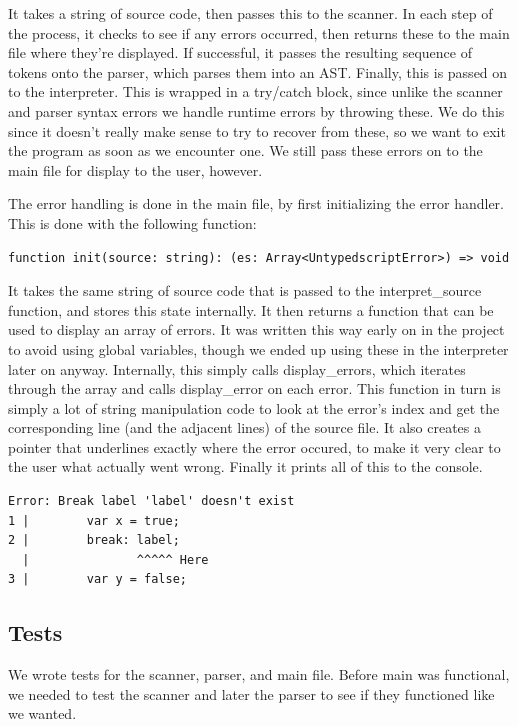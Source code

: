 \documentclass[12pt,a4paper]{article}
\begin{document}
It takes a string of source code, then passes this to the scanner. In each step of the process, it checks to see if any errors occurred, then returns these to the main file where they're displayed. If successful, it passes the resulting sequence of tokens onto the parser, which parses them into an AST. Finally, this is passed on to the interpreter. This is wrapped in a try/catch block, since unlike the scanner and parser syntax errors we handle runtime errors by throwing these. We do this since it doesn't really make sense to try to recover from these, so we want to exit the program as soon as we encounter one. We still pass these errors on to the main file for display to the user, however.

The error handling is done in the main file, by first initializing the error handler. This is done with the following function:
\begin{lstlisting}
function init(source: string): (es: Array<UntypedscriptError>) => void
\end{lstlisting}

It takes the same string of source code that is passed to the interpret_source function, and stores this state internally. It then returns a function that can be used to display an array of errors. It was written this way early on in the project to avoid using global variables, though we ended up using these in the interpreter later on anyway.
Internally, this simply calls display_errors, which iterates through the array and calls display_error on each error. This function in turn is simply a lot of string manipulation code to look at the error's index and get the corresponding line (and the adjacent lines) of the source file. It also creates a pointer that underlines exactly where the error occured, to make it very clear to the user what actually went wrong. Finally it prints all of this to the console.
\lstset{style = }
\begin{lstlisting}[title = Example of an error display]
Error: Break label 'label' doesn't exist
1 |        var x = true;
2 |        break: label;
  |               ^^^^^ Here
3 |        var y = false;
\end{lstlisting}

\lstset{style = Untypedscript}
\subsection{Tests}

We wrote tests for the scanner, parser, and main file. Before main was functional, we needed to test the scanner and later the parser to see if they functioned like we wanted. 
\end{document}
